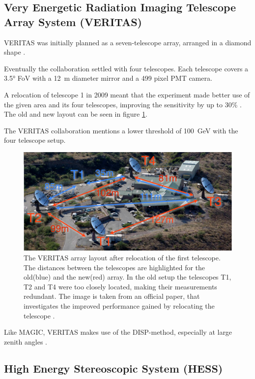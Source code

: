 \subsection{Very Energetic Radiation Imaging Telescope Array System (VERITAS)}
VERITAS	was initially planned as a seven-telescope array, arranged in a diamond shape
\cite{WEEKES2002221}.

Eventually the collaboration settled 
with four telescopes. 
Each telescope covers a 3.5° FoV with a \SI{12}{\meter} diameter mirror and 
a 499 pixel PMT camera.

A relocation of telescope 1 in 2009 meant that the 
experiment made better use of the given area and its four telescopes,
improving the sensitivity by up to 30\% \cite{2009arXiv0912.3841P}.
The old and new layout can be seen in figure \ref{fig:veritas_relocation}.

The VERITAS collaboration mentions a lower threshold of \SI{100}{\giga\electronvolt}
with the four telescope setup.

\begin{figure}
	\center
	\captionsetup{width=0.9\linewidth}
	\includegraphics[width=.9\textwidth]{images/veritas_relocation.png}
	\caption{The VERITAS array layout after relocation of the first 
		telescope. The distances between the telescopes are 
		highlighted for the old(blue) and the new(red) array.
		In the old setup the telescopes T1, T2 and T4 were too closely
		located, making their measurements redundant.
	 	The image is taken from an official paper, that investigates
		the improved performance gained by relocating the telescope \cite{2009arXiv0912.3841P}.}
	\label{fig:veritas_relocation}
\end{figure}

Like MAGIC, VERITAS makes use of the DISP-method, especially at large zenith angles 
\cite{2015ICRC...34..771P}.

\subsection{High Energy Stereoscopic System (HESS)}

